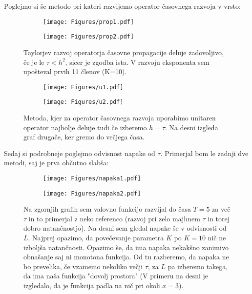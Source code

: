 \documentclass{article}
\begin{document}
Poglejmo si še metodo pri kateri razvijemo operator časovnega razvoja v vrsto:

\begin{figure}[H]
\centering
\begin{subfigure}{.49\textwidth}
\texttt{[image: Figures/prop1.pdf]}
\end{subfigure}
\begin{subfigure}{.49\textwidth}
\texttt{[image: Figures/prop2.pdf]}
\end{subfigure}
\caption*{Taylorjev razvoj operatorja časovne propagacije deluje zadovoljivo, če je le $\tau < h^2$, sicer je zgodba ista. V razvoju eksponenta sem upošteval prvih 11 členov (K=10).}
\end{figure}

\begin{figure}[H]
\centering
\begin{subfigure}{.49\textwidth}
\texttt{[image: Figures/u1.pdf]}
\end{subfigure}
\begin{subfigure}{.49\textwidth}
\texttt{[image: Figures/u2.pdf]}
\end{subfigure}
\caption*{Metoda, kjer za operator časovnega razvoja uporabimo unitaren operator najbolje deluje tudi če izberemo $h=\tau$. Na desni izgleda graf drugače, ker gremo do večjega časa.}
\end{figure}

Sedaj si podrobneje poglejmo odvisnost napake od $\tau$. Primerjal bom le zadnji dve metodi, saj je prva občutno slabša:

\begin{figure}[H]
\centering
\begin{subfigure}{.49\textwidth}
\texttt{[image: Figures/napaka1.pdf]}
\end{subfigure}
\begin{subfigure}{.49\textwidth}
\texttt{[image: Figures/napaka2.pdf]}
\end{subfigure}
\caption*{Na zgornjih grafih sem valovno funkcijo razvijal do časa $T=5$ za več $\tau$ in to primerjal z neko referenco (razvoj pri zelo majhnem $\tau$ in torej dobro natančnostjo). Na desni sem gledal napake še v odvisnosti od $L$. Najprej opazimo, da povečevanje parametra $K$ po $K=10$ nič ne izboljša natančnosti. Opazimo še, da ima napaka nekakšno zanimivo obnašanje saj ni  monotona funkcija. Od tu razberemo, da napaka ne bo prevelika, če vzamemo nekoliko večji $\tau$, za $L$ pa izberemo takega, da ima naša funkcija "dovolj prostora" (V primeru na desni je izgledalo, da je funkcija padla na nič pri okoli $x=3$).}
\end{figure}
\end{document}
